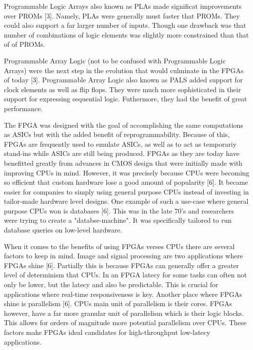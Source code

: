 \documentclass{article}
\begin{document}
    Programmable Logic Arrays also known as PLAs made significat improvements over PROMs [3].
    Namely, PLAs were generally must faster that PROMs. They could also support a far
    larger number of inputs. Though one drawback was that number of combinations of
    logic elements was slightly more constrained than that of of PROMs.

    Programmable Array Logic (not to be confused with Programmable Logic Arrays) were the next
    step in the evolution that would culminate in the FPGAs of today [3]. Programmable Array Logic
    also known as PALS added support for clock elements as well as flip flops. They
    were much more sophisticated in their support for expressing sequential logic. Futhermore,
    they had the benefit of great performance.

    The FPGA was designed with the goal of accomplishing the same computations as ASICs but
    with the added benefit of reprogrammability. Because of this, FPGAs are frequently
    used to emulate ASICs, as well as to act as temporariy stand-ins while ASICs
    are still being produced. FPGAs as they are today have benefitted greatly
    from advances in CMOS design that were initially made with improving CPUs in mind.
    However, it was precisely because CPUs were becoming so efficient that custom hardware
    lose a good amount of popularity [6]. It became easier for companies to simply using
    general purpose CPUs instead of investing in tailor-made hardware level designs.
    One example of such a use-case where general purpose CPUs won is databases [6].
    This was in the late 70's and researchers were trying to create a "databse-machine".
    It was specifically tailored to run database queries on low-level hardware.

    When it comes to the benefits of using FPGAs verses CPUs there are several factors to keep in mind.
    Image and signal processing are two applications where FPGAs shine [6].
    Partially this is because FPGAs can generally offer a greater level of determinism
    that CPUs. In an FPGA latecy for some tasks can often not only be lower, but the latecy
    and also be predictable. This is crucial for applications where real-time
    responsiveness is key. Another place where FPGAs shine is parallelism [6].
    CPUs main unit of parallelism is their cores. FPGAs however, have a far more granular
    unit of parallelism which is their logic blocks. This allows for orders of magnitude
    more potential parallelism over CPUs. These factors make FPGAs ideal candidates
    for high-throughput low-latecy applications.
\end{document}
